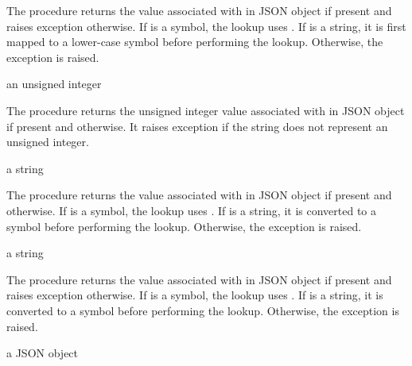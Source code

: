 The  procedure returns the value associated with
 in JSON object  if present and raises exception
 otherwise.  If  is
a symbol, the lookup uses .  If  is a string, it
is first mapped to a lower-case symbol before performing the lookup.
Otherwise, the exception 
is raised.

\begin{procedure}
\end{procedure}
\returns{} an unsigned integer \alt{} 

The  procedure returns the unsigned
integer value associated with  in JSON object
 if present and  otherwise. It raises exception
 if the 
string does not represent an unsigned integer.

\begin{procedure}
\end{procedure}
\returns{} a string \alt{} 

The  procedure returns the value associated with
 in JSON object  if present and 
otherwise.  If  is a symbol, the lookup uses .  If
 is a string, it is converted to a symbol before performing
the lookup.  Otherwise, the exception  is raised.

\begin{procedure}
\end{procedure}
\returns{} a string

The  procedure returns the value associated with
 in JSON object  if present and raises exception
 otherwise.  If  is
a symbol, the lookup uses .  If  is a string, it
is converted to a symbol before performing the lookup.  Otherwise, the
exception  is raised.

\begin{procedure}
\end{procedure}
\returns{} a JSON object

